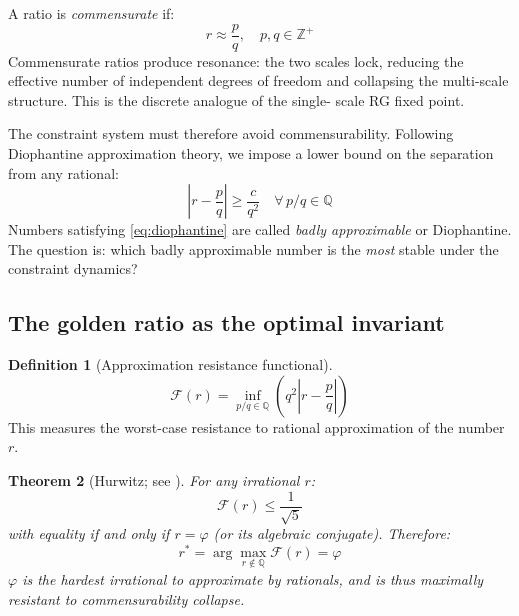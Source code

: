 \documentclass[11pt,a4paper]{article}
\theoremstyle{plain}
\newtheorem{theorem}{Theorem}[section]
\theoremstyle{definition}
\newtheorem{definition}[theorem]{Definition}
\newcommand{\phiGolden}{\varphi}
\begin{document}
A ratio is \emph{commensurate} if:
\begin{equation}
r \approx \frac{p}{q}, \quad p, q \in \mathbb{Z}^+
\end{equation}
Commensurate ratios produce resonance: the two scales lock, reducing
the effective number of independent degrees of freedom and collapsing
the multi-scale structure. This is the discrete analogue of the single-
scale RG fixed point.

The constraint system must therefore avoid commensurability. Following
Diophantine approximation theory, we impose a lower bound on the
separation from any rational:
\begin{equation}
\label{eq:diophantine}
\left| r - \frac{p}{q} \right| \geq \frac{c}{q^2}
  \quad \forall\, p/q \in \mathbb{Q}
\end{equation}
Numbers satisfying \eqref{eq:diophantine} are called \emph{badly
approximable} or Diophantine. The question is: which badly approximable
number is the \emph{most} stable under the constraint dynamics?

\subsection{The golden ratio as the optimal invariant}

\begin{definition}[Approximation resistance functional]
\begin{equation}
\mathcal{F}(r) = \inf_{p/q \in \mathbb{Q}}
  \left( q^2 \left| r - \frac{p}{q} \right| \right)
\end{equation}
This measures the worst-case resistance to rational approximation of
the number $r$.
\end{definition}

\begin{theorem}[Hurwitz; see \citealp{hurwitz1891}]
For any irrational $r$:
\begin{equation}
\mathcal{F}(r) \leq \frac{1}{\sqrt{5}}
\end{equation}
with equality if and only if $r = \phiGolden$ (or its algebraic
conjugate). Therefore:
\begin{equation}
\label{eq:phi_optimal}
r^* = \arg\max_{r \notin \mathbb{Q}} \mathcal{F}(r) = \phiGolden
\end{equation}
$\phiGolden$ is the \emph{hardest} irrational to approximate by
rationals, and is thus maximally resistant to commensurability collapse.
\end{theorem}
\end{document}
